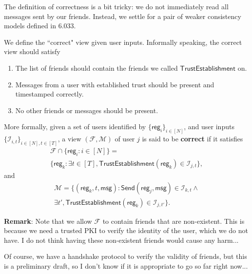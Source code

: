 \documentclass[sigconf, nonacm, balance=false, natbib=false, screen]{acmart}
\newcommand{\msg}{\mathsf{msg}}
\newcommand{\reg}{\mathsf{reg}}
\newcommand{\cI}{\mathcal{I}}
\newcommand{\cF}{\mathcal{F}}
\newcommand{\cM}{\mathcal{M}}
\begin{document}
The definition of correctness is a bit tricky: we do not immediately read all messages sent by our friends. Instead, we settle for a pair of weaker consistency models defined in 6.033. %
\begin{definition}
We define the ``correct" view given user inputs. Informally speaking, the correct view should satisfy
\begin{enumerate}
    \item The list of friends should contain the friends we called $\mathsf{TrustEstablishment}$ on.         
    \item Messages from a user with established trust should be present and timestamped correctly.  
    \item No other friends or messages should be present. 
\end{enumerate}
More formally, given a set of users identified by $\{\reg_i\}_{i \in [N]}$, and user inputs $\{\cI_{i, t}\}_{i \in [N], t \in [T]}$, a view $(\cF, \cM)$ of user $j$ is said to be \textbf{correct} if it satisfies
\begin{multline*}
\cF \cap \{\reg_i: i \in [N]\} = 
 \\ \{\reg_k: \exists t \in [T], \mathsf{TrustEstablishment}(\reg_k) \in \cI_{j, t}\},    
\end{multline*}
and
\begin{multline*}
 \cM = \{(\reg_k, t, \msg): \mathsf{Send}(\reg_j, \msg) \in \cI_{k, t} \land \\
 \exists t', \mathsf{TrustEstablishment}(\reg_k) \in \cI_{j, t'}\}.   
\end{multline*}
\end{definition}
\textbf{Remark}: Note that we allow $\cF$ to contain friends that are non-existent. This is because we need a trusted PKI to verify the identity of the user, which we do not have. I do not think having these non-existent friends would cause any harm...

Of course, we have a handshake protocol to verify the validity of friends, but this is a preliminary draft, so I don't know if it is appropriate to go so far right now...
\end{document}
